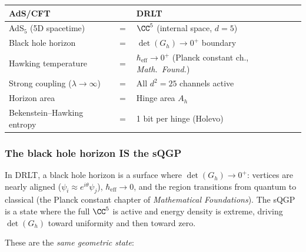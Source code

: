\begin{center}
\begin{tabular}{lcl}
\hline
AdS/CFT & & DRLT \\
\hline
AdS$_5$ (5D spacetime) & $=$ & $\CC^5$ (internal space, $d = 5$) \\
Black hole horizon & $=$ & $\det(G_h) \to 0^+$ boundary \\
Hawking temperature & $=$ & $\hbar_\text{eff} \to 0^+$ (Planck constant ch., \textit{Math.\ Found.}) \\
Strong coupling ($\lambda \to \infty$) & $=$ & All $d^2 = 25$ channels active \\
Horizon area & $=$ & Hinge area $A_h$ \\
Bekenstein--Hawking entropy & $=$ & 1 bit per hinge (Holevo) \\
\hline
\end{tabular}
\end{center}

\subsubsection{The black hole horizon IS the sQGP}

In DRLT, a black hole horizon is a surface where $\det(G_h) \to 0^+$: vertices are nearly aligned ($\psi_i \approx e^{i\theta}\psi_j$), $\hbar_\text{eff} \to 0$, and the region transitions from quantum to classical (the Planck constant chapter of \textit{Mathematical Foundations}). The sQGP is a state where the full $\CC^5$ is active and energy density is extreme, driving $\det(G_h)$ toward uniformity and then toward zero.

These are the \emph{same geometric state}:

